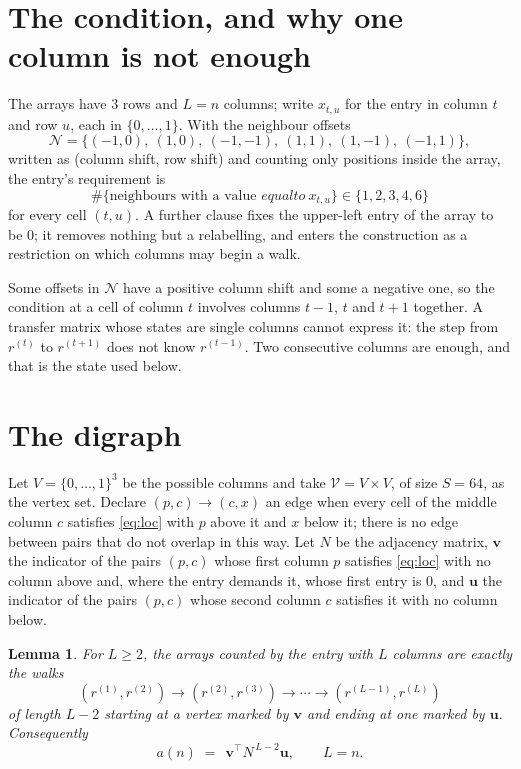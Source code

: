 \documentclass[11pt,a4paper]{article}
\theoremstyle{plain}
\newtheorem{lemma}[theorem]{Lemma}
\theoremstyle{definition}
\begin{document}
\section{The condition, and why one column is not enough}

The arrays have $3$ rows and $L=n$ columns; write $x_{t,u}$ for the entry in
column $t$ and row $u$, each in $\{0,\dots,1\}$. With the neighbour offsets
\[
\mathcal N=\{(-1,0),\ (1,0),\ (-1,-1),\ (1,1),\ (1,-1),\ (-1,1)\},
\]
written as (column shift, row shift) and counting only positions inside the array, the
entry's requirement is
\begin{equation}\label{eq:loc}
\#\{\text{neighbours with a value }equal to\ x_{t,u}\}\in\{1,2,3,4,6\}
\end{equation}
for every cell $(t,u)$. A further clause fixes the upper-left entry of the array to be $0$; it removes nothing but a relabelling, and enters the construction as a restriction on which columns may begin a walk.

Some offsets in $\mathcal N$ have a positive column shift and some a negative one, so the
condition at a cell of column $t$ involves columns $t-1$, $t$ and $t+1$ together. A transfer
matrix whose states are single columns cannot express it: the step from $r^{(t)}$ to
$r^{(t+1)}$ does not know $r^{(t-1)}$. Two consecutive columns are enough, and that is
the state used below.

\section{The digraph}

Let $V=\{0,\dots,1\}^{3}$ be the possible columns and take
$\mathcal V=V\times V$, of size $S=64$, as the vertex set. Declare $(p,c)\to(c,x)$ an edge
when every cell of the middle column $c$ satisfies \eqref{eq:loc} with $p$ above it and $x$
below it; there is no edge between pairs that do not overlap in this way. Let $N$ be the
adjacency matrix, $\mathbf{v}$ the indicator of the pairs $(p,c)$ whose first column $p$
satisfies \eqref{eq:loc} with no column above and, where the entry demands it, whose first entry is $0$, and $\mathbf{u}$ the indicator of
the pairs $(p,c)$ whose second column $c$ satisfies it with no column below.

\begin{lemma}\label{lem:walk}
For $L\ge2$, the arrays counted by the entry with $L$ columns are exactly the walks
\[
(r^{(1)},r^{(2)})\to(r^{(2)},r^{(3)})\to\cdots\to(r^{(L-1)},r^{(L)})
\]
of length $L-2$ starting at a vertex marked by $\mathbf{v}$ and ending at one marked by
$\mathbf{u}$. Consequently
\[
a(n)\;=\;\,\mathbf{v}^{\!\top}N^{\,L-2}\mathbf{u},\qquad L=n .
\]
\end{lemma}
\end{document}
